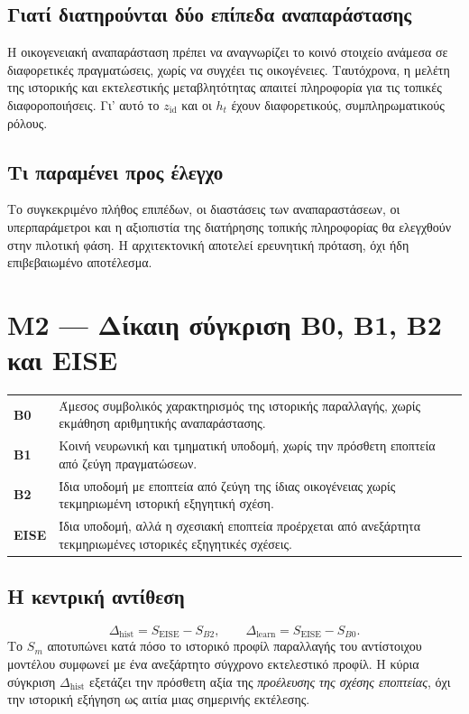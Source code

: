 \documentclass[11pt,a4paper]{extarticle}
\begin{document}
\subsection*{Γιατί διατηρούνται δύο επίπεδα αναπαράστασης}
Η οικογενειακή αναπαράσταση πρέπει να αναγνωρίζει το κοινό στοιχείο ανάμεσα σε διαφορετικές πραγματώσεις, χωρίς να συγχέει τις οικογένειες. Ταυτόχρονα, η μελέτη της ιστορικής και εκτελεστικής μεταβλητότητας απαιτεί πληροφορία για τις τοπικές διαφοροποιήσεις. Γι' αυτό το \(z_{\mathrm{id}}\) και οι \(h_t\) έχουν διαφορετικούς, συμπληρωματικούς ρόλους.

\subsection*{Τι παραμένει προς έλεγχο}
Το συγκεκριμένο πλήθος επιπέδων, οι διαστάσεις των αναπαραστάσεων, οι υπερπαράμετροι και η αξιοπιστία της διατήρησης τοπικής πληροφορίας θα ελεγχθούν στην πιλοτική φάση. Η αρχιτεκτονική αποτελεί ερευνητική πρόταση, όχι ήδη επιβεβαιωμένο αποτέλεσμα.


\section{M2 — Δίκαιη σύγκριση B0, B1, B2 και EISE}
\begin{tabularx}{\linewidth}{>{\bfseries}p{1.35cm}X}
B0 & Άμεσος συμβολικός χαρακτηρισμός της ιστορικής παραλλαγής, χωρίς εκμάθηση αριθμητικής αναπαράστασης.\\
B1 & Κοινή νευρωνική και τμηματική υποδομή, χωρίς την πρόσθετη εποπτεία από ζεύγη πραγματώσεων.\\
B2 & Ίδια υποδομή με εποπτεία από ζεύγη της ίδιας οικογένειας χωρίς τεκμηριωμένη ιστορική εξηγητική σχέση.\\
EISE & Ίδια υποδομή, αλλά η σχεσιακή εποπτεία προέρχεται από ανεξάρτητα τεκμηριωμένες ιστορικές εξηγητικές σχέσεις.\\
\end{tabularx}

\subsection*{Η κεντρική αντίθεση}
\[
\Delta_{\mathrm{hist}}=S_{\mathrm{EISE}}-S_{B2},\qquad
\Delta_{\mathrm{learn}}=S_{\mathrm{EISE}}-S_{B0}.
\]
Το \(S_m\) αποτυπώνει κατά πόσο το ιστορικό προφίλ παραλλαγής του αντίστοιχου μοντέλου συμφωνεί με ένα ανεξάρτητο σύγχρονο εκτελεστικό προφίλ. Η κύρια σύγκριση \(\Delta_{\mathrm{hist}}\) εξετάζει την πρόσθετη αξία της \emph{προέλευσης της σχέσης εποπτείας}, όχι την ιστορική εξήγηση ως αιτία μιας σημερινής εκτέλεσης.
\end{document}
